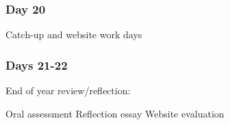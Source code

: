 \documentclass[12pt]{article}
\begin{document}

\subsubsection{Day 20}
Catch-up and website work days
\subsubsection{Days 21-22}
End of year review/reflection:
\begin{outline}
    \1 Oral assessment
\1 Reflection essay
\1 Website evaluation
\end{outline}
\end{document}

